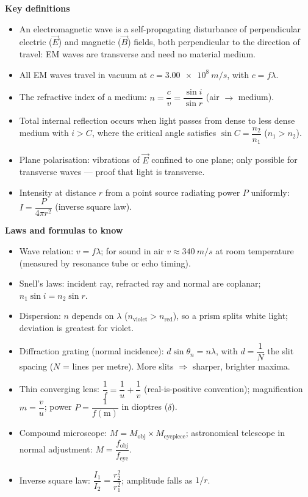 \documentclass[11pt]{article}
\newcommand{\cle}[1]{{\popxbold\color{popdark}#1}}
\begin{document}
\begin{bilan}
\textbf{Key definitions}
\begin{itemize}
\item An \cle{electromagnetic wave} is a self-propagating disturbance of perpendicular electric ($\vec{E}$) and magnetic ($\vec{B}$) fields, both perpendicular to the direction of travel: EM waves are \cle{transverse} and need no material medium.
\item All EM waves travel in vacuum at $c=\SI{3.00e8}{m/s}$, with $c=f\lambda$.
\item The \cle{refractive index} of a medium: $n=\dfrac{c}{v}=\dfrac{\sin i}{\sin r}$ (air $\to$ medium).
\item \cle{Total internal reflection} occurs when light passes from dense to less dense medium with $i>C$, where the \cle{critical angle} satisfies $\sin C=\dfrac{n_{2}}{n_{1}}$ ($n_1>n_2$).
\item \cle{Plane polarisation}: vibrations of $\vec{E}$ confined to one plane; only possible for transverse waves — proof that light is transverse.
\item \cle{Intensity} at distance $r$ from a point source radiating power $P$ uniformly: $I=\dfrac{P}{4\pi r^{2}}$ (inverse square law).
\end{itemize}

\textbf{Laws and formulas to know}
\begin{itemize}
\item Wave relation: $v=f\lambda$; for sound in air $v\approx\SI{340}{m/s}$ at room temperature (measured by resonance tube or echo timing).
\item Snell's laws: incident ray, refracted ray and normal are coplanar; $n_1\sin i=n_2\sin r$.
\item Dispersion: $n$ depends on $\lambda$ ($n_{\text{violet}}>n_{\text{red}}$), so a prism splits white light; deviation is greatest for violet.
\item Diffraction grating (normal incidence): $d\sin\theta_n=n\lambda$, with $d=\dfrac{1}{N}$ the slit spacing ($N$ = lines per metre). More slits $\Rightarrow$ sharper, brighter maxima.
\item Thin converging lens: $\dfrac{1}{f}=\dfrac{1}{u}+\dfrac{1}{v}$ (real-is-positive convention); magnification $m=\dfrac{v}{u}$; power $P=\dfrac{1}{f(\text{m})}$ in \cle{dioptres} ($\delta$).
\item Compound microscope: $M=M_{\text{obj}}\times M_{\text{eyepiece}}$; astronomical telescope in normal adjustment: $M=\dfrac{f_{\text{obj}}}{f_{\text{eye}}}$.
\item Inverse square law: $\dfrac{I_1}{I_2}=\dfrac{r_2^{2}}{r_1^{2}}$; amplitude falls as $1/r$.
\end{itemize}


\end{bilan}
\end{document}
